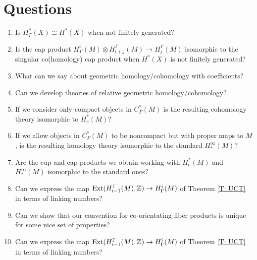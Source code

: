 
\section{Questions}

\begin{enumerate}
	\item Is $H^*_\Gamma(X)\cong H^*(X)$ when not finitely generated?

	\item Is the cap product $H^i_\Gamma(M)\otimes H_{i+j}^\Gamma(M)\to H^\Gamma_j(M)$ isomorphic to the singular co(homology) cap product when $H^*(X)$ is not finitely generated?

	\begin{comment}
		\item For a closed oriented $M^m$, is the Poincar\'e duality map $H^i_\Gamma(M)\to H_{m-i}^\Gamma(M)$ that takes a cochain to a chain simply by converting the co-orientation to an orientation (via our standard construction over oriented manifolds) isomorphic to the singular co(homology) cap product with the fundamental class via the isomorphisms of homology and cohomology groups we have developed.
	\end{comment}

	\item What can we say about geometric homology/cohomology with coefficients?

	\item Can we develop theories of relative geometric homology/cohomology?

	\item If we consider only compact objects in $C_\Gamma^*(M)$ is the resulting cohomology theory isomorphic to $H^*_c(M)$?

	\item If we allow objects in $C^*_\Gamma(M)$ to be noncompact but with proper maps to $M$, is the resulting homology theory isomorphic to the standard $H^\infty_*(M)$?

	\item Are the cup and cap products we obtain working with $H^*_c(M)$ and $H^\infty_*(M)$ isomorphic to the standard ones?

  \item Can we express the map $\text{Ext}(H_{i-1}^\Gamma(M),\mathbb{Z}) \to H^i_\Gamma(M)$ of Theorem \ref{T: UCT} in terms of linking numbers?

	\item Can we show that our convention for co-orientating fiber products is unique for some nice set of properties?

	\item Can we express the map $\text{Ext}(H_{i-1}^\Gamma(M),\mathbb{Z})\to H^i_\Gamma(M)$ of Theorem \ref{T: UCT} in terms of linking numbers?

\end{enumerate}
